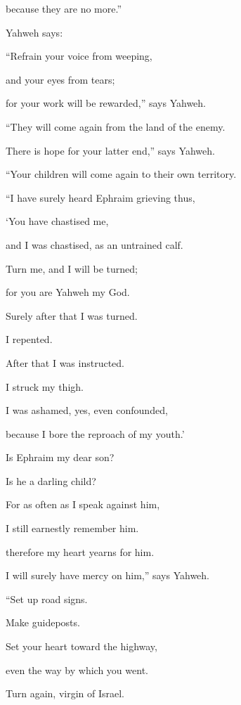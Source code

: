 {\par }{\QB because they are no more.”
\par }{\PP {}Yahweh says:
\par }{\Q “Refrain your voice from weeping,
\par }{\QB and your eyes from tears;
\par }{\QB for your work will be rewarded,” says Yahweh.
\par }{\QB “They will come again from the land of the enemy.
\par }{\Q {}There is hope for your latter end,” says Yahweh.
\par }{\QB “Your children will come again to their own territory.
\par }{\BB \par }{\Q {}“I have surely heard Ephraim grieving thus,
\par }{\QB ‘You have chastised me,
\par }{\QB and I was chastised, as an untrained calf.
\par }{\Q Turn me, and I will be turned;
\par }{\QB for you are Yahweh my God.
\par }{\Q {}Surely after that I was turned.
\par }{\QB I repented.
\par }{\Q After that I was instructed.
\par }{\QB I struck my thigh.
\par }{\Q I was ashamed, yes, even confounded,
\par }{\QB because I bore the reproach of my youth.’
\par }{\Q {}Is Ephraim my dear son?
\par }{\QB Is he a darling child?
\par }{\Q For as often as I speak against him,
\par }{\QB I still earnestly remember him.
\par }{\Q therefore my heart yearns for him.
\par }{\QB I will surely have mercy on him,” says Yahweh.
\par }{\BB \par }{\Q {}“Set up road signs.
\par }{\QB Make guideposts.
\par }{\Q Set your heart toward the highway,
\par }{\QB even the way by which you went.
\par }{\Q Turn again, virgin of Israel.
}
